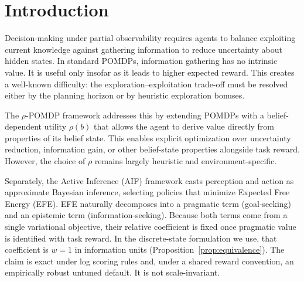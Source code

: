 \documentclass[runningheads]{llncs}
\begin{document}
\section{Introduction}

Decision-making under partial observability requires agents to balance exploiting current knowledge against gathering information to reduce uncertainty about hidden states. In standard POMDPs, information gathering has no intrinsic value. It is useful only insofar as it leads to higher expected reward. This creates a well-known difficulty: the exploration--exploitation trade-off must be resolved either by the planning horizon or by heuristic exploration bonuses.

The $\rho$-POMDP framework \citep{araya2010} addresses this by extending POMDPs with a belief-dependent utility $\rho(b)$ that allows the agent to derive value directly from properties of its belief state. This enables explicit optimization over uncertainty reduction, information gain, or other belief-state properties alongside task reward. However, the choice of $\rho$ remains largely heuristic and environment-specific.

Separately, the Active Inference (AIF) framework \citep{friston2010, parr2019} casts perception and action as approximate Bayesian inference, selecting policies that minimize Expected Free Energy (EFE). EFE naturally decomposes into a pragmatic term (goal-seeking) and an epistemic term (information-seeking). Because both terms come from a single variational objective, their relative coefficient is fixed once pragmatic value is identified with task reward. In the discrete-state formulation we use, that coefficient is $w{=}1$ in information units (Proposition~\ref{prop:equivalence}). The claim is exact under log scoring rules \citep{bernardo1979} and, under a shared reward convention, an empirically robust untuned default. It is not scale-invariant.
\end{document}
